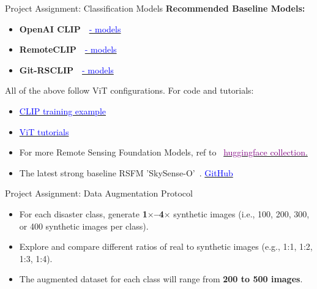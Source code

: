   
  \begin{refsection}
  \begin{frame}{Project Assignment: Classification Models}
    \textbf{Recommended Baseline Models:}
    \begin{itemize}
      \item \textbf{OpenAI CLIP}~\parencite{radfordLearningTransferableVisual2021}~\href{https://hf-mirror.com/openai/clip-vit-base-patch16}{\textcolor{blue}{- models}}
      \item \textbf{RemoteCLIP}~\parencite{liuRemoteCLIPVisionLanguage2024}~\href{https://hf-mirror.com/MVRL/remote-clip-vit-base-patch32}{\textcolor{blue}{- models}}
      \item \textbf{Git-RSCLIP}~\parencite{text2earth2025}~\href{https://hf-mirror.com/lcybuaa/Git-RSCLIP-base}{\textcolor{blue}{- models}}
    \end{itemize}
    \vspace{0.5em}
    All of the above follow ViT configurations. For code and tutorials:
    \begin{itemize}
      \item \href{https://github.com/huggingface/transformers/blob/main/examples/pytorch/contrastive-image-text/README.md}{\textcolor{blue}{CLIP training example}}
      \item \href{https://github.com/NielsRogge/Transformers-Tutorials/tree/master/VisionTransformer}{\textcolor{blue}{ViT tutorials}}
      \item For more Remote Sensing Foundation Models, ref to ~\href{https://hf-mirror.com/collections/MVRL/remote-sensing-foundation-models-664e8fcd67d8ca8c03f42d00}{\textcolor{purple}{huggingface collection}.}
      \item The latest strong baseline RSFM 'SkySense-O'~\parencite{zhuSkySenseOOpenWorldRemote2025}. \href{https://github.com/zqcrafts/SkySense-O}{\textcolor{blue}{GitHub}}

    \end{itemize}
    \bottomleftrefs
  \end{frame}
  \end{refsection}
  
  \begin{refsection}
  \begin{frame}{Project Assignment: Data Augmentation Protocol}
    \begin{itemize}
      \item For each disaster class, generate \textbf{1$\times$--4$\times$} synthetic images (i.e., 100, 200, 300, or 400 synthetic images per class).
      \item Explore and compare different ratios of real to synthetic images (e.g., 1:1, 1:2, 1:3, 1:4).
      \item The augmented dataset for each class will range from \textbf{200 to 500 images}.
    \end{itemize}
    \bottomleftrefs
  \end{frame}
  \end{refsection}
  
